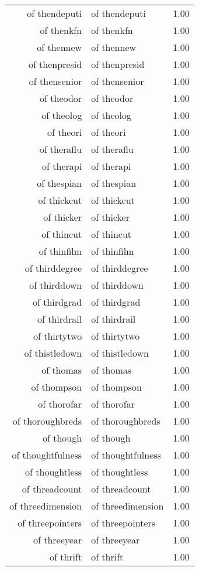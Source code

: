 \begin{table}[ht]
\begin{tabular}{rlr}
  of thendeputi & of thendeputi & 1.00 \\ 
  of thenkfn & of thenkfn & 1.00 \\ 
  of thennew & of thennew & 1.00 \\ 
  of thenpresid & of thenpresid & 1.00 \\ 
  of thensenior & of thensenior & 1.00 \\ 
  of theodor & of theodor & 1.00 \\ 
  of theolog & of theolog & 1.00 \\ 
  of theori & of theori & 1.00 \\ 
  of theraflu & of theraflu & 1.00 \\ 
  of therapi & of therapi & 1.00 \\ 
  of thespian & of thespian & 1.00 \\ 
  of thickcut & of thickcut & 1.00 \\ 
  of thicker & of thicker & 1.00 \\ 
  of thincut & of thincut & 1.00 \\ 
  of thinfilm & of thinfilm & 1.00 \\ 
  of thirddegree & of thirddegree & 1.00 \\ 
  of thirddown & of thirddown & 1.00 \\ 
  of thirdgrad & of thirdgrad & 1.00 \\ 
  of thirdrail & of thirdrail & 1.00 \\ 
  of thirtytwo & of thirtytwo & 1.00 \\ 
  of thistledown & of thistledown & 1.00 \\ 
  of thomas & of thomas & 1.00 \\ 
  of thompson & of thompson & 1.00 \\ 
  of thorofar & of thorofar & 1.00 \\ 
  of thoroughbreds & of thoroughbreds & 1.00 \\ 
  of though & of though & 1.00 \\ 
  of thoughtfulness & of thoughtfulness & 1.00 \\ 
  of thoughtless & of thoughtless & 1.00 \\ 
  of threadcount & of threadcount & 1.00 \\ 
  of threedimension & of threedimension & 1.00 \\ 
  of threepointers & of threepointers & 1.00 \\ 
  of threeyear & of threeyear & 1.00 \\ 
  of thrift & of thrift & 1.00 \\ 

\end{tabular}
\end{table}
